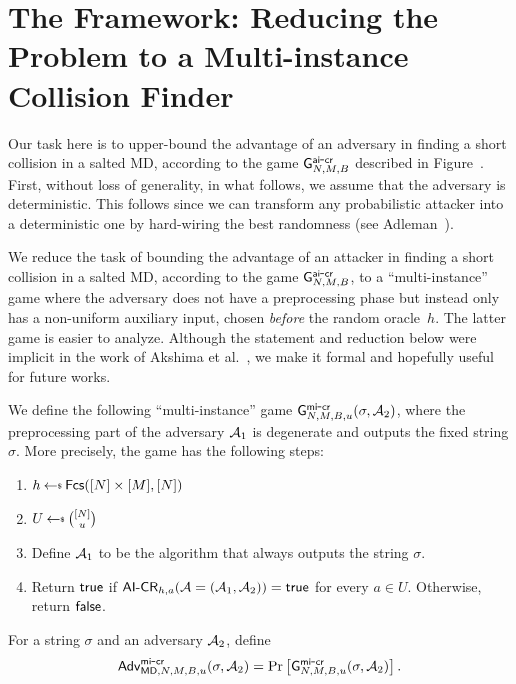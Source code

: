 
\section{The Framework: Reducing the Problem to a Multi-instance Collision Finder}\label{sec:setup}
Our task here is to upper-bound the advantage of an adversary in finding a short collision in a salted MD, according to the game $\mathsf{G}^{{\mathsf{ai}\mbox{-}\mathsf{cr}}}_{N, M, B}$ described in Figure~. 
First, without loss of generality, in what follows, we assume that the adversary is deterministic. This follows since we can transform any probabilistic attacker into a deterministic one by hard-wiring the best randomness (see Adleman~\cite{SFCS:Adleman78}). 

We reduce the task of bounding the advantage of an attacker in finding a short collision in a salted MD, according to the game $\mathsf{G}^{{\mathsf{ai}\mbox{-}\mathsf{cr}}}_{N,M,B}$, to a ``multi-instance'' game where the adversary does not have a preprocessing phase but instead only has a non-uniform auxiliary input, chosen \emph{before} the random oracle~$h$. The latter game is easier to analyze. 
Although the statement and reduction below were implicit in the work of Akshima et al.~\cite{AkshimaCDW20}, we make it formal and hopefully useful for future works. 


We define the following ``multi-instance'' game $\mathsf{G}^{\mathsf{mi}\mbox{-}\mathsf{cr}}_{N,M,B,u}(\sigma, \mathcal{A}_2)$, where the preprocessing part of the adversary $\mathcal{A}_1$ is degenerate and outputs the fixed string $\sigma$. More precisely, the game has the following steps: 
\begin{enumerate}
     \item $h \getsr \Func([N]\times [M], [N])$
    \item $U\getsr \binom{[N]}{u}$
    \item Define $\mathcal{A}_1$ to be the algorithm that always outputs the string $\sigma$. 
    \item Return $\mathsf{true}$ if ${\mathsf{AI}\mbox{-}\mathsf{CR}}_{h,a}(\mathcal{A} = (\mathcal{A}_1,\mathcal{A}_2))=\mathsf{true}$ for every $a\in U$. Otherwise, return $\mathsf{false}$.
\end{enumerate}
For a string $\sigma$ and an adversary $\mathcal{A}_2$, define
\begin{align*}
\mathsf{Adv}^{{\mathsf{mi}\mbox{-}\mathsf{cr}}}_{\mathsf{MD},N,M,B,u} (\sigma, \mathcal{A}_2)=\Pr\left[ \mathsf{G}^{\mathsf{mi}\mbox{-}\mathsf{cr}}_{N,M,B,u}(\sigma, \mathcal{A}_2) \right].
\end{align*}

